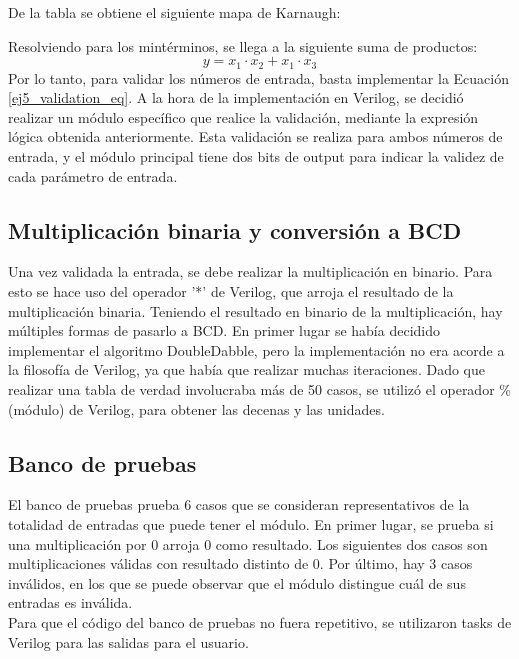 

De la tabla se obtiene el siguiente mapa de Karnaugh:



\noindent
Resolviendo para los mint\'erminos, se llega a la siguiente suma de productos: 
\begin{equation}
    y = x_1\cdot x_2 + x_1\cdot x_3
    \label{ej5_validation_eq}
\end{equation}
\noindent
Por lo tanto, para validar los n\'umeros de entrada, basta implementar la Ecuaci\'on \ref{ej5_validation_eq}. \newline
A la hora de la implementaci\'on en Verilog, se decidi\'o realizar un m\'odulo espec\'ifico que realice la validaci\'on, mediante la expresi\'on l\'ogica obtenida anteriormente. Esta validaci\'on se realiza para ambos n\'umeros de entrada, y el m\'odulo principal tiene dos bits de output para indicar la validez de cada par\'ametro de entrada.
\subsection{Multiplicaci\'on binaria y conversi\'on a BCD}
\noindent
Una vez validada la entrada, se debe realizar la multiplicaci\'on en binario. Para esto se hace uso del operador '*' de Verilog, que arroja el resultado de la multiplicaci\'on binaria. Teniendo el resultado en binario de la multiplicaci\'on, hay m\'ultiples formas de pasarlo a BCD. En primer lugar se hab\'ia decidido implementar el algoritmo DoubleDabble, pero la implementaci\'on no era acorde a la filosof\'ia de Verilog, ya que hab\'ia que realizar muchas iteraciones. Dado que realizar una tabla de verdad involucraba m\'as de 50 casos, se utiliz\'o el operador \% (m\'odulo) de Verilog, para obtener las decenas y las unidades.
\subsection{Banco de pruebas}
\noindent
El banco de pruebas prueba 6 casos que se consideran representativos de la totalidad de entradas que puede tener el m\'odulo. En primer lugar, se prueba si una multiplicaci\'on por 0 arroja 0 como resultado. Los siguientes dos casos son multiplicaciones v\'alidas con resultado distinto de 0. Por \'ultimo, hay 3 casos inv\'alidos, en los que se puede observar que el m\'odulo distingue cu\'al de sus entradas es inv\'alida. \\
Para que el c\'odigo del banco de pruebas no fuera repetitivo, se utilizaron tasks de Verilog para las salidas para el usuario.